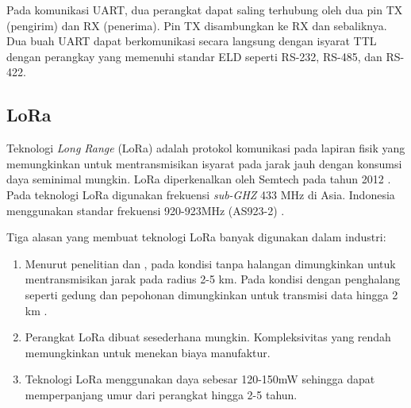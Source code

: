 Pada komunikasi UART, dua perangkat dapat saling terhubung oleh dua pin TX (pengirim) dan RX (penerima). Pin TX disambungkan ke RX dan sebaliknya. Dua buah UART dapat berkomunikasi secara langsung dengan isyarat TTL dengan perangkay yang memenuhi standar ELD seperti RS-232, RS-485, dan RS-422.

\iffalse
\subsection{LoRa}
Teknologi \textit{Long Range} (LoRa) adalah protokol komunikasi pada lapiran fisik yang memungkinkan untuk mentransmisikan isyarat pada jarak jauh dengan konsumsi daya seminimal mungkin. LoRa diperkenalkan oleh Semtech pada tahun 2012 \cite{Oliveira2017}. Pada teknologi LoRa digunakan frekuensi \textit{sub-GHZ} 433 MHz di Asia. Indonesia menggunakan standar frekuensi 920-923MHz (AS923-2) \cite{LoRa2020}.

Tiga alasan yang membuat teknologi LoRa banyak digunakan dalam industri:

\begin{enumerate}
	\item Menurut penelitian \cite{Petajajarvi2016} dan \cite{Haxhibeqiri2017}, pada kondisi tanpa halangan dimungkinkan untuk mentransmisikan jarak pada radius 2-5 km. Pada kondisi dengan penghalang seperti gedung dan pepohonan dimungkinkan untuk transmisi data hingga 2 km \cite{Rida2019}.
	\item Perangkat LoRa dibuat sesederhana mungkin. Kompleksivitas yang rendah memungkinkan untuk menekan biaya manufaktur.
	\item Teknologi LoRa menggunakan daya sebesar 120-150mW sehingga dapat memperpanjang umur dari perangkat hingga 2-5 tahun.
\end{enumerate}

